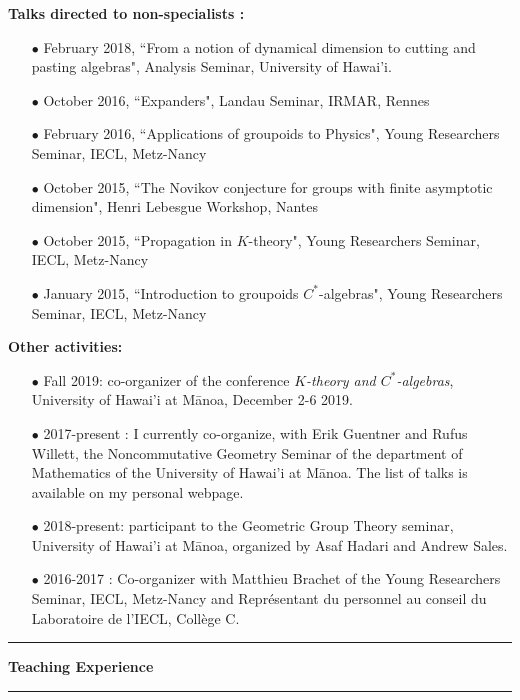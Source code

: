 \documentclass[a4paper,11pt]{article}
\newcommand\espace{\vrule height 20pt width 0pt}
\newcommand{\titre}[1]{%
	\begin{center}
	\bigskip
	\rule{\textwidth}{1pt}
	\par\vspace{0.1cm}
        \textbf{\large #1}
	\par\rule{\textwidth}{1pt}
	\end{center}
	\bigskip
	}
\begin{document}
\textbf{Talks directed to non-specialists :}\\

\begin{itemize}
\item[$\bullet$] February 2018, ``From a notion of dynamical dimension to cutting and pasting algebras", Analysis Seminar, University of Hawai'i.
\item[$\bullet$] October 2016, ``Expanders", Landau Seminar, IRMAR, Rennes %
\item[$\bullet$] February 2016, ``Applications of groupoids to Physics", Young Researchers Seminar, IECL, Metz-Nancy
\item[$\bullet$] October 2015, ``The Novikov conjecture for groups with finite asymptotic dimension", Henri Lebesgue Workshop, Nantes
\item[$\bullet$] October 2015, ``Propagation in $K$-theory", Young Researchers Seminar, IECL, Metz-Nancy
\item[$\bullet$] January 2015, ``Introduction to groupoids $C^*$-algebras", Young Researchers Seminar, IECL, Metz-Nancy
\end{itemize}
\espace

\textbf{Other activities:} 
\begin{itemize}
\item[$\bullet$] Fall 2019: co-organizer of the conference \textit{$K$-theory and $C^*$-algebras}, University of Hawai'i at M\={a}noa, December 2-6 2019. 
\item[$\bullet$] 2017-present : I currently co-organize, with Erik Guentner and Rufus Willett, the Noncommutative Geometry Seminar of the department of Mathematics of the University of Hawai'i at M\={a}noa. The list of talks is available on my personal webpage.
\item[$\bullet$] 2018-present: participant to the Geometric Group Theory seminar, University of Hawai'i at M\={a}noa, organized by Asaf Hadari and Andrew Sales.
\item[$\bullet$] 2016-2017 : Co-organizer with Matthieu Brachet of the Young Researchers Seminar, IECL, Metz-Nancy and Représentant du personnel au conseil du Laboratoire de l'IECL, Collège C.
\end{itemize}

\newpage

\titre{Teaching Experience}
\end{document}
